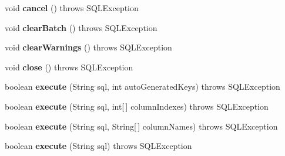 \begin{DoxyCompactItemize}
\mbox{\label{classcom_1_1mysql_1_1cj_1_1jdbc_1_1_statement_wrapper_a98d4c8170ee81e046b7c9f54d4fcd7e7}} 
void {\bfseries cancel} ()  throws S\+Q\+L\+Exception 
\item 
\mbox{\label{classcom_1_1mysql_1_1cj_1_1jdbc_1_1_statement_wrapper_a8428143929073c2c72b0ffbe9784bd0e}} 
void {\bfseries clear\+Batch} ()  throws S\+Q\+L\+Exception 
\item 
\mbox{\label{classcom_1_1mysql_1_1cj_1_1jdbc_1_1_statement_wrapper_aa36ea53280b313a3eb6df0898c20d0ac}} 
void {\bfseries clear\+Warnings} ()  throws S\+Q\+L\+Exception 
\item 
\mbox{\label{classcom_1_1mysql_1_1cj_1_1jdbc_1_1_statement_wrapper_a8f729de503d337665eeb6cb4742cefce}} 
void {\bfseries close} ()  throws S\+Q\+L\+Exception 
\item 
\mbox{\label{classcom_1_1mysql_1_1cj_1_1jdbc_1_1_statement_wrapper_ac20fb16102963956c27b15914502f18c}} 
boolean {\bfseries execute} (String sql, int auto\+Generated\+Keys)  throws S\+Q\+L\+Exception 
\item 
\mbox{\label{classcom_1_1mysql_1_1cj_1_1jdbc_1_1_statement_wrapper_a67b9fcac19a8d585e4ce453d6779b4d3}} 
boolean {\bfseries execute} (String sql, int\mbox{[}$\,$\mbox{]} column\+Indexes)  throws S\+Q\+L\+Exception 
\item 
\mbox{\label{classcom_1_1mysql_1_1cj_1_1jdbc_1_1_statement_wrapper_aecf4f9fbcc925437764b06aee33c1c24}} 
boolean {\bfseries execute} (String sql, String\mbox{[}$\,$\mbox{]} column\+Names)  throws S\+Q\+L\+Exception 
\item 
\mbox{\label{classcom_1_1mysql_1_1cj_1_1jdbc_1_1_statement_wrapper_aaf78b4bbaca9ce81fc559774db18497e}} 
boolean {\bfseries execute} (String sql)  throws S\+Q\+L\+Exception 
\item 

\end{DoxyCompactItemize}
